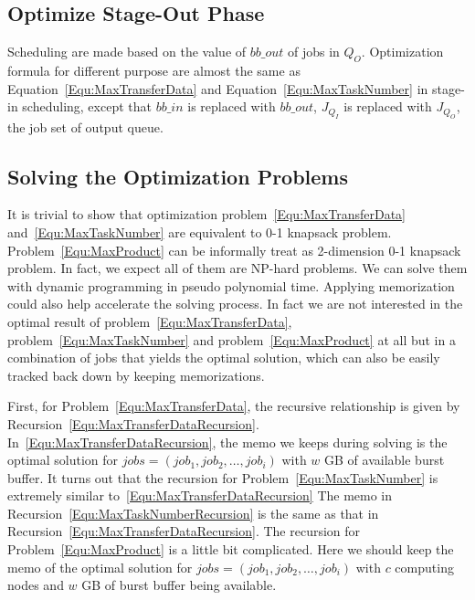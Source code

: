 \subsection{Optimize Stage-Out Phase}
Scheduling are made based on the value of $bb\_out$ of jobs in $Q_O$.
Optimization formula for different purpose are almost the same as
Equation~\ref{Equ:MaxTransferData} and Equation~\ref{Equ:MaxTaskNumber}
in stage-in scheduling, except that $bb\_in$ is replaced with $bb\_out$,
$J_{Q_I}$ is replaced with $J_{Q_O}$, the job set of output queue.


\subsection{Solving the Optimization Problems}
It is trivial to show that optimization problem~\ref{Equ:MaxTransferData}
and~\ref{Equ:MaxTaskNumber}
are equivalent to 0-1 knapsack problem.
Problem~\ref{Equ:MaxProduct} can be informally treat as 2-dimension 0-1 knapsack problem.
In fact, we expect all of them are NP-hard problems.
We can solve them with dynamic programming in pseudo polynomial time.
Applying memorization could also help accelerate the solving process.
In fact we are not interested in the optimal result of problem~\ref{Equ:MaxTransferData},
problem~\ref{Equ:MaxTaskNumber} and problem~\ref{Equ:MaxProduct} at all
but in a combination of jobs that yields the optimal solution,
which can also be easily tracked back down by keeping memorizations.

First, for Problem~\ref{Equ:MaxTransferData}, the recursive relationship is
given by Recursion~\ref{Equ:MaxTransferDataRecursion}.
In~\ref{Equ:MaxTransferDataRecursion}, the memo we keeps during solving is
the optimal solution for 
$jobs=(job_1, job_2, \ldots, job_i)$ with $w$ GB of available burst buffer.
It turns out that the recursion for Problem~\ref{Equ:MaxTaskNumber} is
extremely similar to~\ref{Equ:MaxTransferDataRecursion}
The memo in Recursion~\ref{Equ:MaxTaskNumberRecursion} is the same
as that in Recursion~\ref{Equ:MaxTransferDataRecursion}.
The recursion for Problem~\ref{Equ:MaxProduct} is a little bit complicated.
Here we should keep the memo of the optimal solution for $jobs=(job_1, job_2, \ldots, job_i)$
with $c$ computing nodes and $w$ GB of burst buffer being available.

